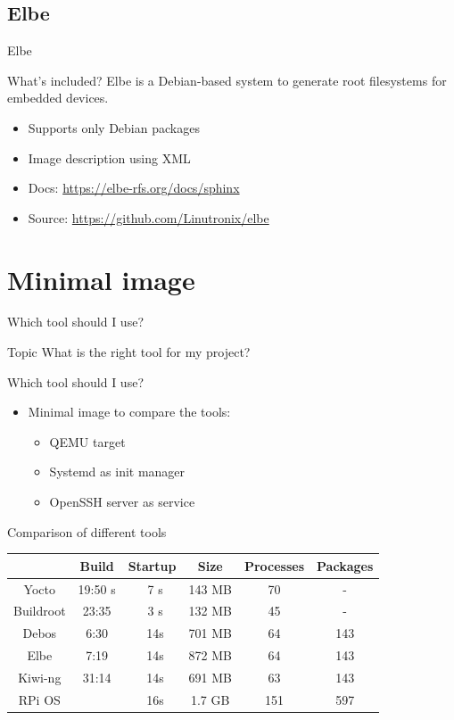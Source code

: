 \documentclass{beamer}
\begin{document}
\subsection{Elbe}

\begin{frame}{Elbe}
	\begin{block}{What's included?} 
		Elbe is a Debian-based system to generate root filesystems for embedded devices.
	\end{block}

	\begin{itemize}
		\item Supports only Debian packages
		\item Image description using XML
		\item Docs: \url{https://elbe-rfs.org/docs/sphinx}
		\item Source: \url{https://github.com/Linutronix/elbe}
	\end{itemize}
\end{frame}

\section{Minimal image}

\begin{frame}{Which tool should I use?}
	\begin{block}{Topic}
		What is the right tool for my project?
	\end{block}
\end{frame}

\begin{frame}{Which tool should I use?}
	\begin{itemize}
		\item Minimal image to compare the tools:
		\begin{itemize}
			\item QEMU target
			\item Systemd as init manager
			\item OpenSSH server as service
		\end{itemize}
	\end{itemize}
\end{frame}

\begin{frame}{Comparison of different tools}
	\begin{tabular}{c|ccccc}
		& \textbf{Build} & \textbf{Startup} & \textbf{Size} & \textbf{Processes} & \textbf{Packages} \\
		\hline
		Yocto & 19:50 s & ~7 s & 143 MB & 70 & - \\ 
		Buildroot & 23:35 & ~3 s & 132 MB & 45 & - \\
		\hline
		Debos & 6:30 & ~14s & 701 MB & 64 & 143 \\
		Elbe & 7:19 & ~14s & 872 MB & 64 & 143 \\
		Kiwi-ng & 31:14 & ~14s & 691 MB & 63 & 143 \\
		\hline
		RPi OS & & ~16s & 1.7 GB & 151 & 597 \\
	\end{tabular}
\end{frame}
\end{document}
